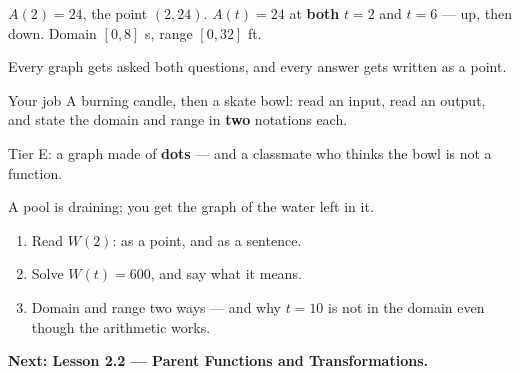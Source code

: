 \documentclass[aspectratio=169, 11pt]{beamer}
\begin{document}
\begin{frame}[t, plain]
  \begin{center}
  \end{center}
  \vspace{-0.2cm}
  $A(2)=24$, the point $(2,24)$. \quad $A(t)=24$ at \textbf{both} $t=2$ and $t=6$ --- up, then
  down. \quad Domain $[0,8]$ s, range $[0,32]$ ft.
\end{frame}

\begin{frame}[t, plain]
  Every graph gets asked both questions, and every answer gets written as a point.
  \begin{block}{Your job}
    A burning candle, then a skate bowl: read an input, read an output, and state the domain and
    range in \textbf{two} notations each.
  \end{block}
  \vspace{0.15cm}
  Tier E: a graph made of \textbf{dots} --- and a classmate who thinks the bowl is not a function.
\end{frame}

\begin{frame}[t, plain]
  A pool is draining; you get the graph of the water left in it.
  \begin{enumerate}
    \setlength{\itemsep}{0.3cm}
    \item Read $W(2)$: as a point, and as a sentence.
    \item Solve $W(t)=600$, and say what it means.
    \item Domain and range two ways --- and why $t=10$ is not in the domain even though the
          arithmetic works.
  \end{enumerate}
  \vspace{0.25cm}
  {\color{royal}\bfseries Next: Lesson 2.2 --- Parent Functions and Transformations.}
\end{frame}
\end{document}
